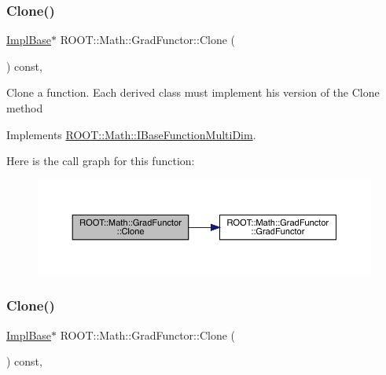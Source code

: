 \subsubsection{\texorpdfstring{Clone()}{Clone()}\hspace{0.1cm}{\footnotesize\ttfamily [1/3]}}
{\footnotesize\ttfamily \mbox{\hyperlink{classROOT_1_1Math_1_1GradFunctor_a1fb9161fc93c7e7fa185dddbcc2c4f4d}{Impl\+Base}}$\ast$ R\+O\+O\+T\+::\+Math\+::\+Grad\+Functor\+::\+Clone (\begin{DoxyParamCaption}{ }\end{DoxyParamCaption}) const\hspace{0.3cm}{\ttfamily [inline]}, {\ttfamily [virtual]}}

Clone a function. Each derived class must implement his version of the Clone method 

Implements \mbox{\hyperlink{classROOT_1_1Math_1_1IBaseFunctionMultiDim_a57939204b1f525b43835b42e0635dd3b}{R\+O\+O\+T\+::\+Math\+::\+I\+Base\+Function\+Multi\+Dim}}.

Here is the call graph for this function\+:
\nopagebreak
\begin{figure}[H]
\begin{center}
\leavevmode
\includegraphics[width=350pt]{de/d74/classROOT_1_1Math_1_1GradFunctor_a21093c0d3001069e49ce6278b5a32a40_cgraph}
\end{center}
\end{figure}
\mbox{\label{classROOT_1_1Math_1_1GradFunctor_a21093c0d3001069e49ce6278b5a32a40}} 
\subsubsection{\texorpdfstring{Clone()}{Clone()}\hspace{0.1cm}{\footnotesize\ttfamily [2/3]}}
{\footnotesize\ttfamily \mbox{\hyperlink{classROOT_1_1Math_1_1GradFunctor_a1fb9161fc93c7e7fa185dddbcc2c4f4d}{Impl\+Base}}$\ast$ R\+O\+O\+T\+::\+Math\+::\+Grad\+Functor\+::\+Clone (\begin{DoxyParamCaption}{ }\end{DoxyParamCaption}) const\hspace{0.3cm}{\ttfamily [inline]}, {\ttfamily [virtual]}}

